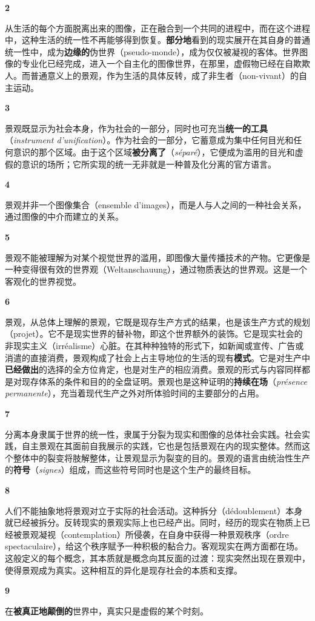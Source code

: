\documentclass[fontset=fandol, a4paper, 12pt, openright]{ctexbook}
\makeatletter
\newcommand{\thesis}[1]{%
    \par\vspace{1.5em}%
    {\centering \textbf{\Large #1}\par}%
    \nobreak\vspace{0.5em}\nobreak
    \@afterindenttrue %
    \@afterheading    %
}
\makeatother
\begin{document}
\thesis{2}
从生活的每个方面脱离出来的图像，正在融合到一个共同的进程中，而在这个进程中，这种生活的统一性不再能够得到恢复。\textbf{部分地}看到的现实展开在其自身的普通统一性中，成为\textbf{边缘的}伪世界（pseudo-monde），成为仅仅被凝视的客体。世界图像的专业化已经完成，进入一个自主化的图像世界，在那里，虚假物已经在自欺欺人。而普通意义上的景观，作为生活的具体反转，成了非生者（non-vivant）的自主运动。

\thesis{3}
景观既显示为社会本身，作为社会的一部分，同时也可充当\textbf{统一的工具}（\textit{instrument d'unification}）。作为社会的一部分，它蓄意成为集中任何目光和任何意识的那个区域。由于这个区域\textbf{被分离了}（\textit{séparé}），它便成为滥用的目光和虚假的意识的场所；它所实现的统一无非就是一种普及化分离的官方语言。

\thesis{4}
景观并非一个图像集合（ensemble d'images），而是人与人之间的一种社会关系，通过图像的中介而建立的关系。

\thesis{5}
景观不能被理解为对某个视觉世界的滥用，即图像大量传播技术的产物。它更像是一种变得很有效的世界观（Weltanschauung），通过物质表达的世界观。这是一个客观化的世界视觉。

\thesis{6}
景观，从总体上理解的景观，它既是现存生产方式的结果，也是该生产方式的规划（projet）。它不是现实世界的替补物，即这个世界额外的装饰。它是现实社会的非现实主义（irréalisme）心脏。在其种种独特的形式下，如新闻或宣传、广告或消遣的直接消费，景观构成了社会上占主导地位的生活的现有\textbf{模式}。它是对生产中\textbf{已经做出}的选择的全方位肯定，也是对生产的相应消费。景观的形式与内容同样都是对现存体系的条件和目的的全盘证明。景观也是这种证明的\textbf{持续在场}（\textit{présence permanente}），充当着现代生产之外对所体验时间的主要部分的占用。

\thesis{7}
分离本身隶属于世界的统一性，隶属于分裂为现实和图像的总体社会实践。社会实践，自主景观在其面前自我展示的实践，它也是包括景观在内的现实整体。然而这个整体中的裂变将肢解整体，让景观显示为裂变的目的。景观的语言由统治性生产的\textbf{符号}（\textit{signes}）组成，而这些符号同时也是这个生产的最终目标。

\thesis{8}
人们不能抽象地将景观对立于实际的社会活动。这种拆分（dédoublement）本身就已经被拆分。反转现实的景观实际上也已经产出。同时，经历的现实在物质上已经被景观凝视（contemplation）所侵袭，在自身中获得一种景观秩序（ordre spectaculaire），给这个秩序赋予一种积极的黏合力。客观现实在两方面都在场。这般定义的每个概念，其本质就是概念向其反面的过渡：现实突然出现在景观中，使得景观成为真实。这种相互的异化是现存社会的本质和支撑。

\thesis{9}
在\textbf{被真正地颠倒的}世界中，真实只是虚假的某个时刻。
\end{document}
